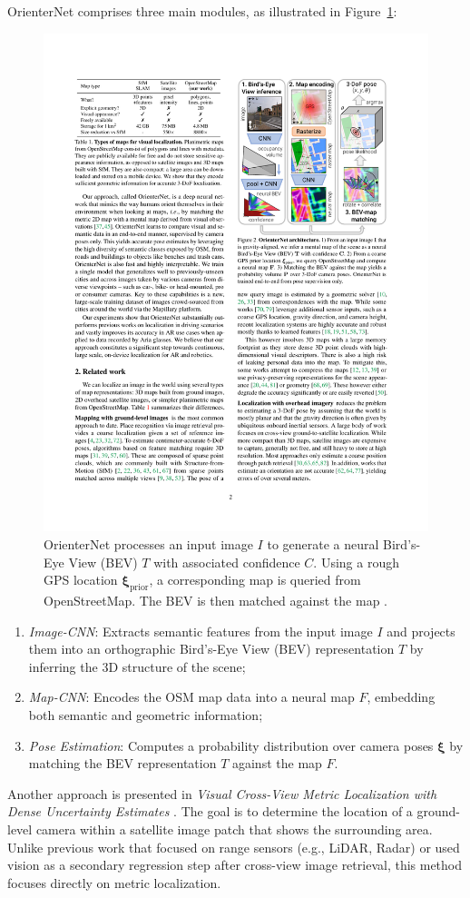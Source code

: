 OrienterNet comprises three main modules, as illustrated in Figure~\ref{fig:orienternet}:
\begin{figure}[H]
    \centering
    \includegraphics[width=0.55\linewidth]{LateX//figs/2304.02009v1.pdf}
    \caption{OrienterNet processes an input image \( I \) to generate a neural Bird’s-Eye View (BEV) \( T \) with associated confidence \( C \). Using a rough GPS location \( \boldsymbol{\xi}_{\text{prior}} \), a corresponding map is queried from OpenStreetMap. The BEV is then matched against the map \cite{sarlin2023orienternetvisuallocalization2d}.}
    \label{fig:orienternet}
\end{figure}


\begin{enumerate}
    \item \textit{Image-CNN}: Extracts semantic features from the input image \( I \) and projects them into an orthographic Bird’s-Eye View (BEV) representation \( T \) by inferring the 3D structure of the scene;
    \item \textit{Map-CNN}: Encodes the OSM map data into a neural map \( F \), embedding both semantic and geometric information;
    \item \textit{Pose Estimation}: Computes a probability distribution over camera poses \( \boldsymbol{\xi} \) by matching the BEV representation \( T \) against the map \( F \). 
\end{enumerate}

Another approach is presented in \textit{Visual Cross-View Metric Localization with Dense Uncertainty Estimates} \cite{xia2022visualcrossviewmetriclocalization}. The goal is to determine the location of a ground-level camera within a satellite image patch that shows the surrounding area. Unlike previous work that focused on range sensors (e.g., LiDAR, Radar) or used vision as a secondary regression step after cross-view image retrieval, this method focuses directly on metric localization. 

